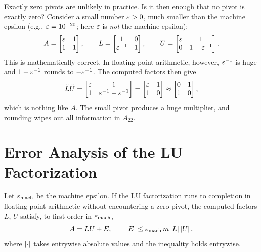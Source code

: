 Exactly zero pivots are unlikely in practice. Is it then enough that no pivot is exactly zero? Consider a small number $\varepsilon > 0$, much smaller than the machine epsilon (e.g., $\varepsilon = 10^{-20}$; here $\varepsilon$ is \emph{not} the machine epsilon):
\begin{equation}
  A = \begin{bmatrix} \varepsilon & 1 \\ 1 & 1 \end{bmatrix}, \qquad
  L = \begin{bmatrix} 1 & 0 \\ \varepsilon^{-1} & 1 \end{bmatrix}, \qquad
  U = \begin{bmatrix} \varepsilon & 1 \\ 0 & 1 - \varepsilon^{-1} \end{bmatrix}.
\end{equation}
This is mathematically correct. In floating-point arithmetic, however, $\varepsilon^{-1}$ is huge and $1 - \varepsilon^{-1}$ rounds to $-\varepsilon^{-1}$. The computed factors then give
\begin{equation}
  \tilde{L}\tilde{U} = \begin{bmatrix} \varepsilon & 1 \\ 1 & \varepsilon^{-1} - \varepsilon^{-1} \end{bmatrix} = \begin{bmatrix} \varepsilon & 1 \\ 1 & 0 \end{bmatrix} \approx \begin{bmatrix} 0 & 1 \\ 1 & 0 \end{bmatrix},
\end{equation}
which is nothing like $A$. The small pivot produces a huge multiplier, and rounding wipes out all information in $A_{22}$.

\section{Error Analysis of the LU Factorization}

\begin{theorem}
  \label{thm:lu-backward-preview}
  Let $\varepsilon_{\mathrm{mach}}$ be the machine epsilon. If the LU factorization runs to completion in floating-point arithmetic without encountering a zero pivot, the computed factors $L$, $U$ satisfy, to first order in $\varepsilon_{\mathrm{mach}}$,
  \begin{equation}
    A = LU + E, \qquad \left\lvert E \right\rvert \le \varepsilon_{\mathrm{mach}}\, m\left\lvert L \right\rvert\left\lvert U \right\rvert,
  \end{equation}
  where $\left\lvert \cdot \right\rvert$ takes entrywise absolute values and the inequality holds entrywise.
\end{theorem}


